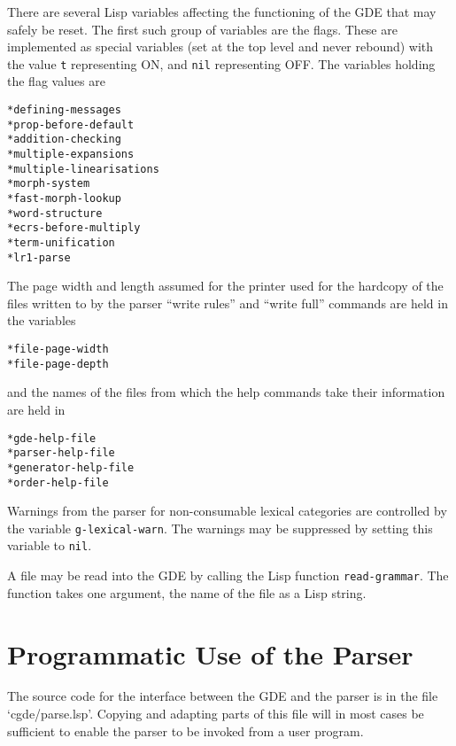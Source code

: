 There are several Lisp variables affecting the functioning of the GDE
that may safely be reset.  The first such group of variables are the
flags. These are implemented as special variables (set at the top
level and never rebound) with the value {\tt t} representing ON, and
{\tt nil} representing OFF. The variables holding the flag values are
\begin{ex}
\begin{verbatim}
*defining-messages
*prop-before-default
*addition-checking
*multiple-expansions
*multiple-linearisations 
*morph-system 
*fast-morph-lookup 
*word-structure
*ecrs-before-multiply
*term-unification
*lr1-parse
\end{verbatim}
\end{ex}
The page width and length assumed for the printer used for the hardcopy
of the files written to by the parser ``write rules'' and ``write full''
commands are held in the variables
\begin{ex}
\begin{verbatim}
*file-page-width
*file-page-depth
\end{verbatim}
\end{ex}
and the names of the files from which the help commands take their
information are held in
\begin{ex}
\begin{verbatim}
*gde-help-file
*parser-help-file
*generator-help-file
*order-help-file
\end{verbatim}
\end{ex}
Warnings from the parser for non-consumable lexical categories are
controlled by the variable {\tt g-lexical-warn}. The warnings may
be suppressed by setting this variable to {\tt nil}.

A file may be read into the GDE by calling the Lisp function
{\tt read-grammar}. The function takes one argument, the name of the file
as a Lisp string. 

\section{Programmatic Use of the Parser}

The source code for the interface between the GDE and the parser is
in the file `cgde/parse.lsp'. Copying and adapting parts of
this file will in most cases be sufficient to enable the parser to be
invoked from a user program.

